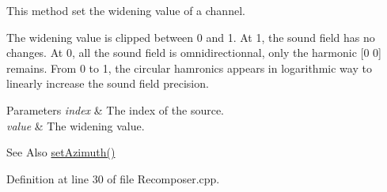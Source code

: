 This method set the widening value of a channel. 

The widening value is clipped between 0 and 1. At 1, the sound field has no changes. At 0, all the sound field is omnidirectionnal, only the harmonic \mbox{[}0 0\mbox{]} remains. From 0 to 1, the circular hamronics appears in logarithmic way to linearly increase the sound field precision.


\begin{DoxyParams}{Parameters}
{\em index} & The index of the source. \\
\hline
{\em value} & The widening value. \\
\hline
\end{DoxyParams}
\begin{DoxySeeAlso}{See Also}
\hyperlink{class_hoa2_d_1_1_recomposer_a2c1827fa0b25648b787077469e52a820}{set\-Azimuth()} 
\end{DoxySeeAlso}


Definition at line 30 of file Recomposer.\-cpp.

